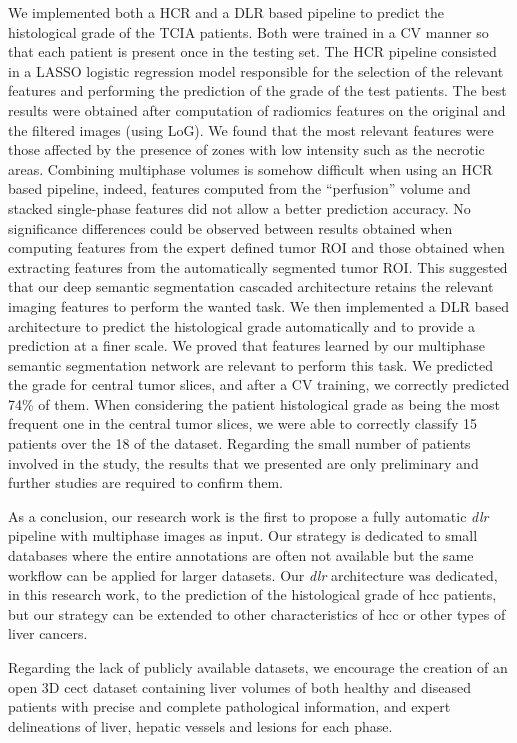 We implemented both a HCR and a DLR based pipeline to predict the histological grade of the TCIA patients. Both were trained in a CV manner so that each patient is present once in the testing set. The HCR pipeline consisted in a LASSO logistic regression model responsible for the selection of the relevant features and performing the prediction of the grade of the test patients. The best results were obtained after computation of radiomics features on the original and the filtered images (using LoG). We found that the most relevant features were those affected by the presence of zones with low intensity such as the necrotic areas. Combining multiphase volumes is somehow difficult when using an HCR based pipeline, indeed, features computed from the ``perfusion'' volume and stacked single-phase features did not allow a better prediction accuracy. No significance differences could be observed between results obtained when computing features from the expert defined tumor ROI and those obtained when extracting features from the automatically segmented tumor ROI. This suggested that our deep semantic segmentation cascaded architecture retains the relevant imaging features to perform the wanted task.
We then implemented a DLR based architecture to predict the histological grade automatically and to provide a prediction at a finer scale.
We proved that features learned by our multiphase semantic segmentation network are relevant to perform this task.
We predicted the grade for central tumor slices, and after a CV
training, we correctly predicted 74\% of them. When considering the
patient histological grade as being the most frequent one in the central
tumor slices, we were able to correctly classify 15 patients over the 18
of the dataset. Regarding the small number of patients involved in the study,
the results that we presented are only preliminary and further studies are required to confirm them.

As a conclusion, our research work is the first to propose a fully
automatic \emph{\ac{dlr}} pipeline with multiphase images as input. Our
strategy is dedicated to small databases where the entire annotations
are often not available but the same workflow can be applied for larger
datasets. Our \emph{\ac{dlr}} architecture was dedicated, in this research work, to the prediction of the histological grade of \ac{hcc} patients, but our strategy can be extended to other characteristics of \ac{hcc} or other types of liver cancers.

Regarding the lack of publicly available datasets, we encourage the
creation of an open 3D \ac{cect} dataset containing liver volumes of both
healthy and diseased patients with precise and complete pathological
information, and expert delineations of liver, hepatic vessels and
lesions for each phase.


